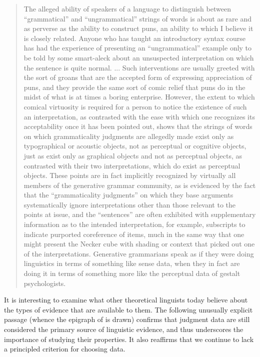 \begin{quote}
The alleged ability of speakers of a language to distinguish between ``grammatical'' and ``ungrammatical'' strings of words is about as rare and as perverse as the ability to construct puns, an ability to which I believe it is closely related. Anyone who has taught an introductory syntax course has had the experience of presenting an ``ungrammatical'' example only to be told by some smart-aleck about an unsuspected interpretation on which the sentence is quite normal. ... Such interventions are usually greeted with the sort of groans that are the accepted form of expressing appreciation of puns, and they provide the same sort of comic relief that puns do in the midst of what is at times a boring enterprise. However, the extent to which comical virtuosity is required for a person to notice the existence of such an interpretation, as contrasted with the ease with which one recognizes its acceptability once it has been pointed out, shows that the strings of words on which grammaticality judgments are allegedly made exist only as typographical or acoustic objects, not as perceptual or cognitive objects, just as  exist only as graphical objects and not as perceptual objects, as contrasted with their two interpretations, which do exist as perceptual objects. These points are in fact implicitly recognized  by virtually  all members of the generative grammar community, as is evidenced by the fact that the ``grammaticality judgments'' on which they base arguments systematically ignore interpretations other than those relevant to the points at issue, and the ``sentences'' are often exhibited with supplementary information as to the intended interpretation, for example, subscripts to indicate purported coreference of items, much in the same way that one might present the Necker cube with shading or context that picked out one of the interpretations. Generative grammarians speak as if they were doing linguistics in terms of something like sense data, when they in
fact are doing it in terms of something more like the perceptual data of gestalt psychologists.  \citep[78\textendash{}79]{McCawley1982}
\end{quote}

It is interesting to examine what other theoretical linguists today believe about the types of evidence that are available to them. The following unusually explicit passage (whence the epigraph of  is drawn) confirms that judgment data are still considered the primary source of linguistic evidence, and thus
underscores the importance of studying their properties. It also reaffirms that we continue to lack a principled criterion for choosing data.

